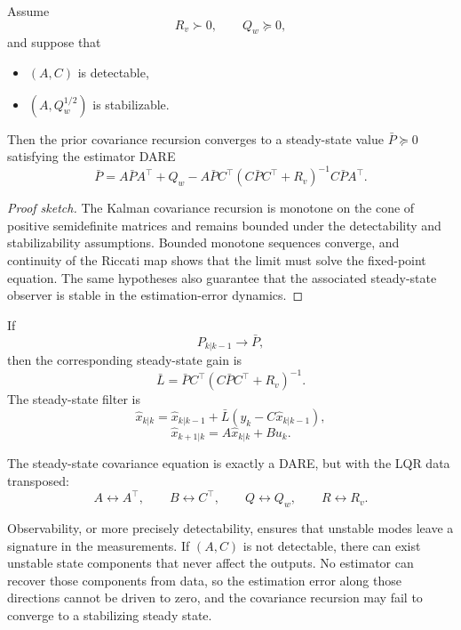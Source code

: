 \begin{theorem}\label{thm:l7-steady-state-convergence-conditions}
	Assume
	\[
		R_v \succ 0,
		\qquad
		Q_w \succeq 0,
	\]
	and suppose that
	\begin{itemize}
		\item $(A,C)$ is detectable,
		\item $(A,Q_w^{1/2})$ is stabilizable.
	\end{itemize}
	Then the prior covariance recursion converges to a steady-state value $\bar P \succeq 0$ satisfying the estimator DARE
	\[
		\bar P
		=
		A \bar P A^\top + Q_w
		-
		A \bar P C^\top\left(C\bar P C^\top + R_v\right)^{-1}C\bar P A^\top.
	\]
\end{theorem}
\begin{proof}[Proof sketch]
	The Kalman covariance recursion is monotone on the cone of positive semidefinite matrices and remains bounded under the detectability and stabilizability assumptions. Bounded monotone sequences converge, and continuity of the Riccati map shows that the limit must solve the fixed-point equation. The same hypotheses also guarantee that the associated steady-state observer is stable in the estimation-error dynamics.
\end{proof}

\begin{definition}\label{def:l7-steady-state-kalman-filter}
	If
	\[
		P_{k|k-1} \to \bar P,
	\]
	then the corresponding steady-state gain is
	\[
		\bar L = \bar P C^\top(C\bar P C^\top + R_v)^{-1}.
	\]
	The steady-state filter is
	\[
		\hat x_{k|k} = \hat x_{k|k-1} + \bar L(y_k-C\hat x_{k|k-1}),
	\]
	\[
		\hat x_{k+1|k} = A\hat x_{k|k}+Bu_k.
	\]
\end{definition}

\begin{remark}
	The steady-state covariance equation is exactly a DARE, but with the LQR data transposed:
	\[
		A \leftrightarrow A^\top,
		\qquad
		B \leftrightarrow C^\top,
		\qquad
		Q \leftrightarrow Q_w,
		\qquad
		R \leftrightarrow R_v.
	\]
\end{remark}

\begin{remark}
	Observability, or more precisely detectability, ensures that unstable modes leave a signature in the measurements. If $(A,C)$ is not detectable, there can exist unstable state components that never affect the outputs. No estimator can recover those components from data, so the estimation error along those directions cannot be driven to zero, and the covariance recursion may fail to converge to a stabilizing steady state.
\end{remark}

